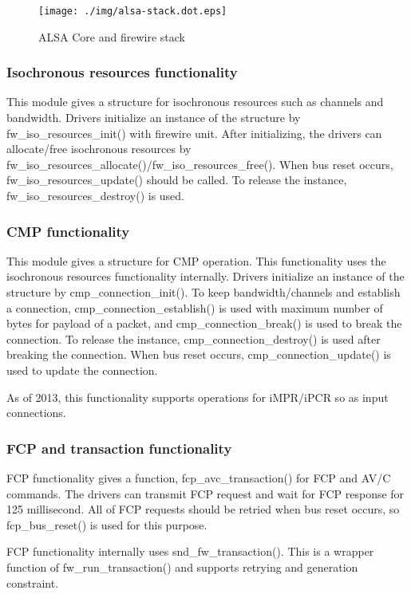 \documentclass[onecolumn]{article}
\begin{document}
\begin{figure}[htbp]
	\centering
	\texttt{[image: ./img/alsa-stack.dot.eps]}
	\caption{{ALSA Core and firewire stack}}
	\label{alsa_stack}
\end{figure}

\subsubsection{Isochronous resources functionality}

This module gives a structure for isochronous resources such as channels and bandwidth. Drivers initialize an instance of the structure by fw\_iso\_resources\_init() with firewire unit. After initializing, the drivers can allocate/free isochronous resources by fw\_iso\_resources\_allocate()/fw\_iso\_resources\_free(). When bus reset occurs, fw\_iso\_resources\_update() should be called. To release the instance, fw\_iso\_resources\_destroy() is used.

\subsubsection{CMP functionality}

This module gives a structure for CMP operation. This functionality uses the isochronous resources functionality internally. Drivers initialize an instance of the structure by cmp\_connection\_init(). To keep bandwidth/channels and establish a connection, cmp\_connection\_establish() is used with maximum number of bytes for payload of a packet, and cmp\_connection\_break() is used to break the connection. To release the instance, cmp\_connection\_destroy() is used after breaking the connection. When bus reset occurs, cmp\_connection\_update() is used to update the connection.

As of 2013, this functionality supports operations for iMPR/iPCR so as input connections.

\subsubsection{FCP and transaction functionality}

FCP functionality gives a function, fcp\_avc\_transaction() for FCP and AV/C commands. The drivers can transmit FCP request and wait for FCP response for 125 millisecond. All of FCP requests should be retried when bus reset occurs, so fcp\_bus\_reset() is used for this purpose.

FCP functionality internally uses snd\_fw\_transaction(). This is a wrapper function of fw\_run\_transaction() and supports retrying and generation constraint.
\end{document}

